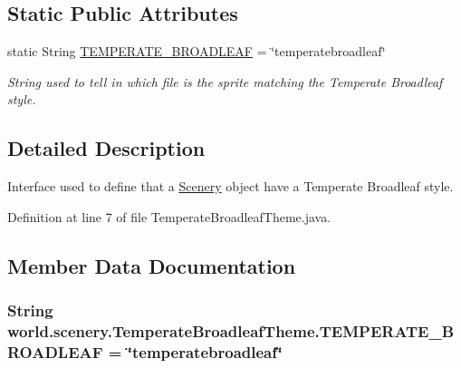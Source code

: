 \subsection*{Static Public Attributes}
\begin{DoxyCompactItemize}
\item 
static String \hyperlink{interfaceworld_1_1scenery_1_1_temperate_broadleaf_theme_a9e9253b684231327dd6ddeca5768033e}{T\-E\-M\-P\-E\-R\-A\-T\-E\-\_\-\-B\-R\-O\-A\-D\-L\-E\-A\-F} = \char`\"{}temperatebroadleaf\char`\"{}
\begin{DoxyCompactList}\small\item\em String used to tell in which file is the sprite matching the Temperate Broadleaf style. \end{DoxyCompactList}\end{DoxyCompactItemize}


\subsection{Detailed Description}
Interface used to define that a \hyperlink{classworld_1_1scenery_1_1_scenery}{Scenery} object have a Temperate Broadleaf style. 

Definition at line 7 of file Temperate\-Broadleaf\-Theme.\-java.



\subsection{Member Data Documentation}
\hypertarget{interfaceworld_1_1scenery_1_1_temperate_broadleaf_theme_a9e9253b684231327dd6ddeca5768033e}{
\subsubsection[{T\-E\-M\-P\-E\-R\-A\-T\-E\-\_\-\-B\-R\-O\-A\-D\-L\-E\-A\-F}]{\setlength{\rightskip}{0pt plus 5cm}String world.\-scenery.\-Temperate\-Broadleaf\-Theme.\-T\-E\-M\-P\-E\-R\-A\-T\-E\-\_\-\-B\-R\-O\-A\-D\-L\-E\-A\-F = \char`\"{}temperatebroadleaf\char`\"{}\hspace{0.3cm}{\ttfamily [static]}}}\label{interfaceworld_1_1scenery_1_1_temperate_broadleaf_theme_a9e9253b684231327dd6ddeca5768033e}


